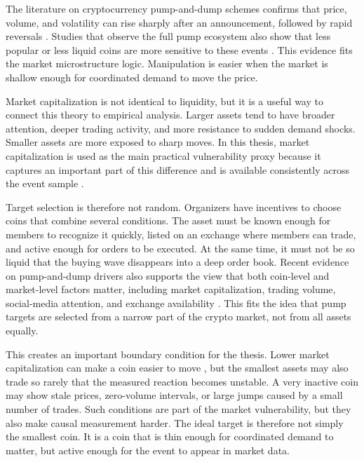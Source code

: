 The literature on cryptocurrency pump-and-dump schemes confirms that price, volume, and volatility can rise sharply after an announcement, followed by rapid reversals \cite{li2021cryptocurrency}. Studies that observe the full pump ecosystem also show that less popular or less liquid coins are more sensitive to these events \cite{hamrick2021examination}. This evidence fits the market microstructure logic. Manipulation is easier when the market is shallow enough for coordinated demand to move the price.

Market capitalization is not identical to liquidity, but it is a useful way to connect this theory to empirical analysis. Larger assets tend to have broader attention, deeper trading activity, and more resistance to sudden demand shocks. Smaller assets are more exposed to sharp moves. In this thesis, market capitalization is used as the main practical vulnerability proxy because it captures an important part of this difference and is available consistently across the event sample \cite{amihud2002illiquidity, hamrick2021examination}.

Target selection is therefore not random. Organizers have incentives to choose coins that combine several conditions. The asset must be known enough for members to recognize it quickly, listed on an exchange where members can trade, and active enough for orders to be executed. At the same time, it must not be so liquid that the buying wave disappears into a deep order book. Recent evidence on pump-and-dump drivers also supports the view that both coin-level and market-level factors matter, including market capitalization, trading volume, social-media attention, and exchange availability \cite{charfeddine2024drives}. This fits the idea that pump targets are selected from a narrow part of the crypto market, not from all assets equally.

This creates an important boundary condition for the thesis. Lower market capitalization can make a coin easier to move \cite{amihud2002illiquidity, hamrick2021examination}, but the smallest assets may also trade so rarely that the measured reaction becomes unstable. A very inactive coin may show stale prices, zero-volume intervals, or large jumps caused by a small number of trades. Such conditions are part of the market vulnerability, but they also make causal measurement harder. The ideal target is therefore not simply the smallest coin. It is a coin that is thin enough for coordinated demand to matter, but active enough for the event to appear in market data.

